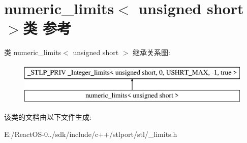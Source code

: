 \hypertarget{classnumeric__limits_3_01unsigned_01short_01_4}{}\section{numeric\+\_\+limits$<$ unsigned short $>$类 参考}
\label{classnumeric__limits_3_01unsigned_01short_01_4}
类 numeric\+\_\+limits$<$ unsigned short $>$ 继承关系图\+:\begin{figure}[H]
\begin{center}
\leavevmode
\includegraphics[height=2.000000cm]{classnumeric__limits_3_01unsigned_01short_01_4}
\end{center}
\end{figure}


该类的文档由以下文件生成\+:\begin{DoxyCompactItemize}
\item 
E\+:/\+React\+O\+S-\/0../sdk/include/c++/stlport/stl/\+\_\+limits.\+h\end{DoxyCompactItemize}
